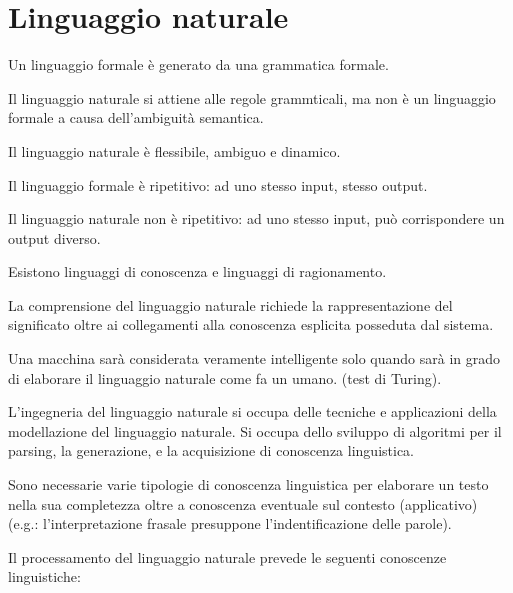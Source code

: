\chapter{Linguaggio naturale}
\label{chp:natural-language}

Un linguaggio formale è generato da una grammatica formale. 

Il linguaggio naturale si attiene alle regole grammticali, ma non è un linguaggio formale a causa dell'ambiguità semantica.

Il linguaggio naturale è flessibile, ambiguo e dinamico.

Il linguaggio formale è ripetitivo: ad uno stesso input, stesso output.

Il linguaggio naturale non è ripetitivo: ad uno stesso input, può corrispondere un output diverso.

Esistono linguaggi di conoscenza e linguaggi di ragionamento.

La comprensione del linguaggio naturale richiede la rappresentazione del significato oltre ai collegamenti alla conoscenza esplicita posseduta dal sistema.

Una macchina sarà considerata veramente intelligente solo quando sarà in grado di elaborare il linguaggio naturale come fa un umano. (test di Turing).

L'ingegneria del linguaggio naturale si occupa delle tecniche e applicazioni della modellazione del linguaggio naturale. 
Si occupa dello sviluppo di algoritmi per il parsing, la generazione, e la acquisizione di conoscenza linguistica.

Sono necessarie varie tipologie di conoscenza linguistica per elaborare un testo nella sua completezza oltre a conoscenza eventuale sul contesto (applicativo) (e.g.: l'interpretazione frasale presuppone l'indentificazione delle parole).

Il processamento del linguaggio naturale prevede le seguenti conoscenze linguistiche:

